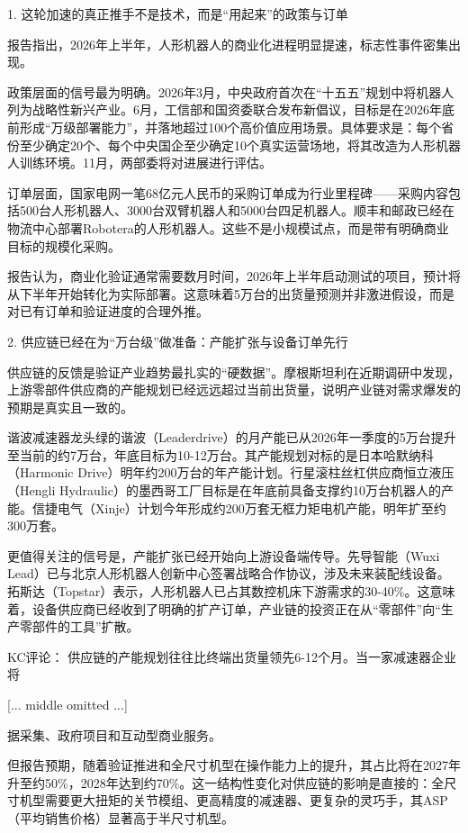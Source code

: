 \documentclass[11pt]{ctexart}
\begin{document}
1. 这轮加速的真正推手不是技术，而是“用起来”的政策与订单

报告指出，2026年上半年，人形机器人的商业化进程明显提速，标志性事件密集出现。

政策层面的信号最为明确。2026年3月，中央政府首次在“十五五”规划中将机器人列为战略性新兴产业。6月，工信部和国资委联合发布新倡议，目标是在2026年底前形成“万级部署能力”，并落地超过100个高价值应用场景。具体要求是：每个省份至少确定20个、每个中央国企至少确定10个真实运营场地，将其改造为人形机器人训练环境。11月，两部委将对进展进行评估。

订单层面，国家电网一笔68亿元人民币的采购订单成为行业里程碑——采购内容包括500台人形机器人、3000台双臂机器人和5000台四足机器人。顺丰和邮政已经在物流中心部署Robotera的人形机器人。这些不是小规模试点，而是带有明确商业目标的规模化采购。

报告认为，商业化验证通常需要数月时间，2026年上半年启动测试的项目，预计将从下半年开始转化为实际部署。这意味着5万台的出货量预测并非激进假设，而是对已有订单和验证进度的合理外推。

2. 供应链已经在为“万台级”做准备：产能扩张与设备订单先行

供应链的反馈是验证产业趋势最扎实的“硬数据”。摩根斯坦利在近期调研中发现，上游零部件供应商的产能规划已经远远超过当前出货量，说明产业链对需求爆发的预期是真实且一致的。

谐波减速器龙头绿的谐波（Leaderdrive）的月产能已从2026年一季度的5万台提升至当前的约7万台，年底目标为10-12万台。其产能规划对标的是日本哈默纳科（Harmonic Drive）明年约200万台的年产能计划。行星滚柱丝杠供应商恒立液压（Hengli Hydraulic）的墨西哥工厂目标是在年底前具备支撑约10万台机器人的产能。信捷电气（Xinje）计划今年形成约200万套无框力矩电机产能，明年扩至约300万套。

更值得关注的信号是，产能扩张已经开始向上游设备端传导。先导智能（Wuxi Lead）已与北京人形机器人创新中心签署战略合作协议，涉及未来装配线设备。拓斯达（Topstar）表示，人形机器人已占其数控机床下游需求的30-40\%。这意味着，设备供应商已经收到了明确的扩产订单，产业链的投资正在从“零部件”向“生产零部件的工具”扩散。

KC评论： 供应链的产能规划往往比终端出货量领先6-12个月。当一家减速器企业将

[... middle omitted ...]

据采集、政府项目和互动型商业服务。

但报告预期，随着验证推进和全尺寸机型在操作能力上的提升，其占比将在2027年升至约50\%，2028年达到约70\%。这一结构性变化对供应链的影响是直接的：全尺寸机型需要更大扭矩的关节模组、更高精度的减速器、更复杂的灵巧手，其ASP（平均销售价格）显著高于半尺寸机型。
\end{document}
